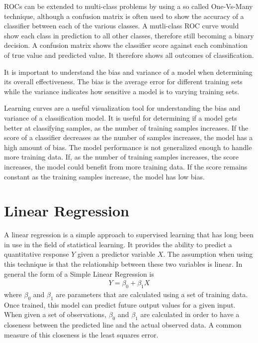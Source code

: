 ROCs can be extended to multi-class problems by using a so called One-Vs-Many technique, although a confusion matrix is often used to show the accuracy of a classifier between each of the various classes.  A mutli-class ROC curve would show each class in prediction to all other classes, therefore still becoming a binary decision.  A confusion matrix shows the classifier score against each combination of true value and predicted value.  It therefore shows all outcomes of classification.

It is important to understand the bias and variance of a model when determining its overall effectiveness.  The bias is the average error for different training sets while the variance indicates how sensitive a model is to varying training sets.

Learning curves are a useful visualization tool for understanding the bias and variance of a classification model.  It is useful for determining if a model gets better at classifying samples, as the number of training samples increases.  If the score of a classifier decreases as the number of samples increases, the model has a high amount of bias.  The model performance is not generalized enough to handle more training data.  If, as the number of training samples increases, the score increases, the model could benefit from more training data.  If the score remains constant as the training samples increase, the model has low bias.
%
\section{Linear Regression}
%
%
A linear regression is a simple approach to supervised learning that has long been in use in the field of statistical learning.  It provides the ability to predict a quantitative response $Y$ given a predictor variable $X$.  The assumption when using this technique is that the relationship between these two variables is linear.  In general the form of a Simple Linear Regression is
%
\begin{align}
    Y = \beta_0 + \beta_1 X
\end{align}
%
where $\beta_0$ and $\beta_1$ are parameters that are calculated using a set of training data.  Once trained, this model can predict future output values for a given input.  When given a set of observations, $\beta_0$ and $\beta_1$ are calculated in order to have a closeness between the predicted line and the actual observed data.  A common measure of this closeness is the least squares error.

